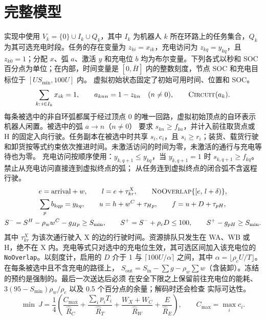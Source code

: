 \documentclass[11pt,a4paper,fontset=none]{ctexart}
\newcommand{\code}[1]{\texttt{#1}}
\begin{document}
\section{完整模型}
\label{app:model}

实现中使用 $V_k = \{0\} \cup I_k \cup Q_k$，其中 $I_k$ 为机器人 $k$ 所在环路上的任务集合，$Q_k$ 为其可选充电时段。任务的存在变量为 $z_{ki} = x_{ik}$，充电访问为
$z_{kq} = y_{kq}$，且 $z_{k0} = 1$；分配 $x$、弧 $a$、激活 $y$ 和充电位 $b$ 均为布尔变量。下列各式以秒和
SOC 百分点为单位；在内部，时间变量是 $[0, \bar H]$ 内的整数刻度，节点 SOC 和充电目标位于 $[U S_{\min}, 100U]$ 内。
虚拟初始状态固定了初始可用时间、位置和 SOC。
\begin{equation}
\sum_{k:\, i \in I_k} x_{ik} = 1, \qquad a_{knn} = 1 - z_{kn} \quad (n \ne 0), \qquad
\textsc{Circuit}(a_k).
\end{equation}
每条被选中的非自环弧都属于经过顶点 0 的唯一回路，虚拟初始顶点的自环表示机器人闲置。被选中的弧 $a \to n$（$n \ne 0$）
要求 $s_{kn} \ge f_{ka}$，并计入前往取货点或 H 的固定入向行驶。任务副本在被选中时共享 $s_i, c_i$，且
$s_i \ge r_i$；装货、载货行驶和卸货按等式约束依次推进时间。未激活访问的时间为零，未激活的通行与充电等待也为零。
充电访问按顺序使用：$y_{k,q+1} \le y_{kq}$，当 $y_{k,q+1} = 1$ 时 $s_{k,q+1} \ge f_{kq}$。禁止从充电访问直接连到虚拟终点的弧；
从任务连到虚拟终点的闭合弧不含返程行驶。
\begin{gather}
e = \text{arrival} + w, \qquad l = e + \tau^{X}_{kr}, \qquad \textsc{NoOverlap}\{[e,\, l + \delta)\}, \\
\sum_{p} b_{kqp} = y_{kq}, \qquad u = h + w^{C} + \tau_{Hp}, \qquad f = u + D + \tau_{pH}, \\
S^{-} = S^{H} - \rho_w w^{C} - g_{Hp} \ge S_{\min}, \qquad S^{+} = S^{-} + \rho_c D \le 100, \qquad
S^{+} - g_{pH} \ge S_{\min}.
\end{gather}
其中 $\tau^{X}_{kr}$ 为该次通行驶入 X 的边的行驶时间。资源排队只发生在 WA、WB 或 H，绝不在 X 内。充电等式只对选中的充电位生效，其可选区间加入该充电位的
\code{NoOverlap}。以刻度计，启用的 $D$ 介于 1 与 $\lceil 100U/\alpha \rceil$ 之间，其中
$\alpha = \lfloor \rho_c U / T \rfloor$。在每条被选中且不含充电的路径上，
$S_{\text{out}} = S_{\text{in}} - \sum g - \rho_w \sum w$（含装卸）。冻结的预约是强制的。最后一次送达后必须
在安全下限之上保留前往充电位的能耗、$3(95 - S_{\min})\rho_w/\rho_c$ 以及 0.5 个百分点的余量；解码时还会检查
实际可达性。
\begin{equation}
\min\ J = \frac{1}{4}\left( \frac{C_{\max}}{\hat R_C} + \frac{\sum_i p_i T_i}{\hat R_T}
  + \frac{W_X + W_C}{\hat R_W} + \frac{E}{\hat R_E} \right), \qquad C_{\max} = \max_i c_i .
\end{equation}
\end{document}
